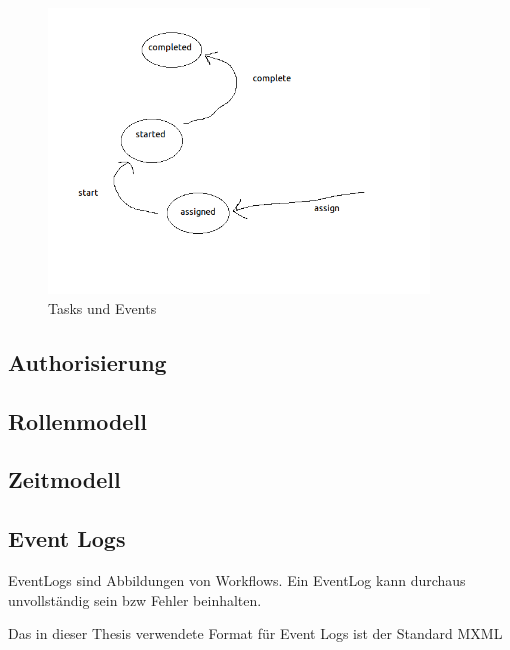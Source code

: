 \begin{figure}[ht]
	\centering
  \includegraphics[width=0.9\textwidth]{"Figures/Task Events"}
	\caption{Tasks und Events}
	\label{fig2}
\end{figure}

\subsection{Authorisierung}

\subsection{Rollenmodell}

\subsection{Zeitmodell}

\subsection{Event Logs}

EventLogs sind Abbildungen von Workflows. Ein EventLog kann durchaus unvollständig sein bzw Fehler beinhalten.

Das in dieser Thesis verwendete Format für Event Logs ist der Standard MXML

